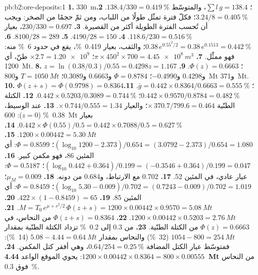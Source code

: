 \begin{solution}{pb:b2:ore-deposits:1}
\textbf{1.} \qty{330}{m}؛ $\sum l\,g = 138.4$، والمتوسّط $138.4/330 = \qty{0.419}{\percent}$.
\textbf{2.} $3.24/8 = \qty{0.405}{\percent}$؛ فكلّ فترة تمثّل طولًا من اللباب، ومن ثمّ
حجمًا من الصخر: ويجب أن تُحسب الفترة الطويلة أكثر من القصيرة.
\textbf{3.} $230/330 = 0.697$، بعيار $118.6/230 = \qty{0.516}{\percent}$.
\textbf{4.} $4190/28 = 150$.
\textbf{5.} $8100/28 = 289$.
\textbf{6.} $0.38\,e^{0.55^2/2} = 0.38\,e^{0.1513} = \qty{0.442}{\percent}$؛ والثقب، بعيار
\qty{0.419}{\percent}، يقع في حدود \qty{6}{\percent} منه: فهو ممثِّل.
\textbf{7.} $\pi \times 450^2 \times 700 = \qty{4.45e8}{m^3}$؛ $\times 2.7 = \num{1.20e9}$ طنّ،
أي \qty{1200}{Mt}.
\textbf{8.} $z = \ln(0.38/0.3)/0.55 = 0.4298$؛ $\Phi(z) = 0.6663$.
\textbf{9.} $z = 1.167$ و0.4298 و$-0.4990$؛ $\Phi = 0.8784$ و0.6663 و0.3089؛ $T = \qty{1050}{Mt}$
و\qty{800}{Mt} و\qty{371}{Mt}.
\textbf{10.} $\Phi(z + s) = \Phi(0.9798) = 0.8364$؛ $\bar g = 0.442 \times 0.8364/0.6663 =
\qty{0.555}{\percent}$.
\textbf{11.} $0.442 \times 0.9570/0.8784 = \qty{0.482}{\percent}$؛ $0.442 \times 0.5203/0.3089 =
\qty{0.744}{\percent}$.
\textbf{12.} الكتلة الطنّية $\times\, 370.7/799.6 = 0.464$؛ والعيار $\times\, 0.744/0.555 = 1.34$.
\textbf{13.} عند الوسيط، \qty{0.38}{\percent} ($z = 0$): \qty{600}{Mt} بعيار $0.442 \times
\Phi(0.55)/0.5 = 0.442 \times 0.7088/0.5 = \qty{0.627}{\percent}$.
\textbf{14.} $1200 \times 0.00442 = \qty{5.30}{Mt}$.
\textbf{15.} $(\log_{10} 1200 - 2.373)/0.654 = (3.0792 - 2.373)/0.654 = 1.080$؛ $\Phi = 0.8599$: أي
المئين 86، فهو مكمن كبير.
\textbf{16.} $(\log_{10} 0.442 + 0.364)/0.199 = (-0.3546 + 0.364)/0.199 = 0.047$؛ $\Phi = 0.5187$: عيار
عادي، في المئين 52.
\textbf{17.} 0.702 مع الارتباط، و0.684 من دونه.
\textbf{18.} $\mu_M = 0.009$؛ $(\log_{10} 5.30 - 0.009)/0.702 = (0.7243 - 0.009)/0.702 = 1.019$؛ $\Phi =
0.8459$: أي المئين 85.
\textbf{19.} $422 \times (1 - 0.8459) = 65$.
\textbf{20.} $M = T_0\,e^{\mu + s^2/2}\,\Phi(z + s) = 1200 \times 0.00442 \times 0.9570 =
\qty{5.08}{Mt}$.
\textbf{21.} $1200 \times 0.00442 \times 0.5203 = \qty{2.76}{Mt}$.
\textbf{22.} $\Phi(z + s) = 0.8364$ من النحاس، في $\Phi(z) = 0.6663$ من الكتلة الطنّية.
\textbf{23.} من 0.3 إلى \qty{0.2}{\percent} تزداد الكتلة الطنّية بمقدار $1054 - 800 = \qty{254}{Mt}$
(\qty{32}{\percent}) والنحاس بمقدار $5.08 - 4.44 = \qty{0.64}{Mt}$ (\qty{14}{\percent}): فمتوسّط عيار الكتل
المضافة $0.64/254 = \qty{0.25}{\percent}$، وهي أفقر كتل المكمن.
\textbf{24.} $1200 \times 0.00442 \times 0.8364 = 800 \times 0.00555$: يحوي الموقع الواعد
\textbf{\qty[text-series-to-math=true]{4.44}{Mt}} من النحاس فوق  \qty{0.3}{\percent}.
\end{solution}
